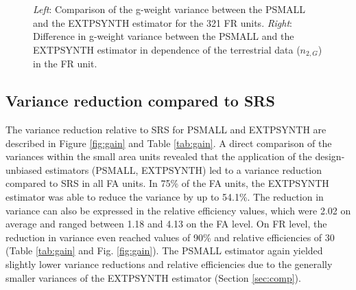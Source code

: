 \documentclass[remotesensing,article,submit,moreauthors,pdftex,10pt,a4paper]{mdpi}
\newcommand{\psmall}{PSMALL}
\newcommand{\extpsynth}{EXTPSYNTH}
\begin{document}
\begin{figure}[H]
	\centering
	\caption{\textit{Left}: Comparison of the g-weight variance between the PSMALL and the EXTPSYNTH estimator for the 321 FR units.
		\textit{Right}: Difference in g-weight variance between the PSMALL and the EXTPSYNTH estimator in dependence of the terrestrial data ($n_{2,G}$) in the FR unit.}
	\label{fig:compvar}
\end{figure}




\subsection{Variance reduction compared to SRS}
\label{sec:gain_eval}

The variance reduction relative to SRS for \psmall{} and \extpsynth{} are described in Figure \ref{fig:gain} and Table \ref{tab:gain}. A direct comparison of the variances within the small area units revealed that the application of the design-unbiased estimators (\psmall{}, \extpsynth{}) led to a variance reduction compared to SRS in all FA units. In 75\% of the FA units, the \extpsynth{} estimator was able to reduce the variance by up to 54.1\%. The reduction in variance can also be expressed in the relative efficiency values, which were 2.02 on average and ranged between 1.18 and 4.13 on the FA level. On FR level, the reduction in variance even reached values of 90\% and relative efficiencies of 30 (Table \ref{tab:gain} and Fig. \ref{fig:gain}). The \psmall{} estimator again yielded slightly lower variance reductions and relative efficiencies due to the generally smaller variances of the \extpsynth{} estimator (Section \ref{sec:comp}).
\end{document}
